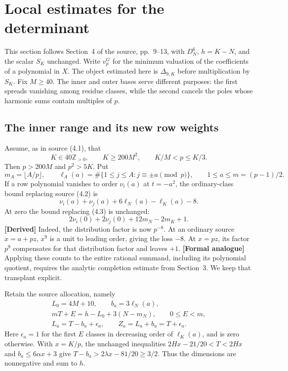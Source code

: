 \section{Local estimates for the determinant}
\label{s4-local}

This section follows Section~4 of the source, pp.~9--13, with
$D_N^6$, $h=K-N$, and the scalar $S_K$ unchanged.  Write $v_p^G$ for
the minimum valuation of the coefficients of a polynomial in $X$.
The object estimated here is $\Delta_{9,K}$ before multiplication by
$S_K$.  Fix $M\geq40$.  The inner and outer bases serve different
purposes: the first spreads vanishing among residue classes, while the
second cancels the poles whose harmonic sums contain multiples of $p$.

\subsection{The inner range and its new row weights}
\label{s4-inner}

Assume, as in source (4.1), that
\begin{equation}
 K\in40\mathbb Z_{>0},\qquad K\geq200M^2,
 \qquad K/M<p\leq K/3.
 \label{s4-inner-range}
\end{equation}
Then $p>200M$ and $p^2>5K$.  Put
\[
 m_A=\lfloor A/p\rfloor,\qquad
 \ell_A(a)=\#\{1\leq j\leq A:j\equiv\pm a\pmod p\},
 \qquad 1\leq a\leq m=(p-1)/2.
\]
If a row polynomial vanishes to order $\nu_i(a)$ at $t=-a^2$,
the ordinary-class bound replacing source (4.2) is
\begin{equation}
 \nu_i(a)+\nu_j(a)+6\ell_N(a)-\ell_K(a)-8.
 \label{s4-ordinary-source}
\end{equation}
At zero the bound replacing (4.3) is unchanged:
\begin{equation}
 2\nu_i(0)+2\nu_j(0)+12m_N-2m_K+1.
 \label{s4-zero-source}
\end{equation}
\textbf{[Derived]}
Indeed, the distribution factor is now $p^{-8}$.  At an ordinary
source $x=a+pz$, $x^9$ is a unit to leading order, giving the loss
$-8$.  At $x=pz$, its factor $p^9$ compensates for that distribution
factor and leaves $+1$.
\textbf{[Formal analogue]} Applying these counts to the entire rational
summand, including its polynomial quotient, requires the analytic
completion estimate from Section~3.  We keep that transplant explicit.

Retain the source allocation, namely
\begin{equation}
 \begin{gathered}
 L_0=4M+10,\qquad b_a=3\ell_N(a),\\
 mT+E=h-L_0+3(N-m_N),\qquad 0\leq E<m,\\
 L_a=T-b_a+\epsilon_a,\qquad Z_a=L_a+b_a=T+\epsilon_a.
 \end{gathered}
 \label{s4-allocation}
\end{equation}
Here $\epsilon_a=1$ for the first $E$ classes in decreasing order of
$\ell_K(a)$, and is zero otherwise.  With $x=K/p$, the unchanged
inequalities
$2Hx-21/20<T<2Hx$ and $b_a\leq6\alpha x+3$ give
$T-b_a>2\lambda x-81/20\geq3/2$.  Thus the dimensions are
nonnegative and sum to $h$.

